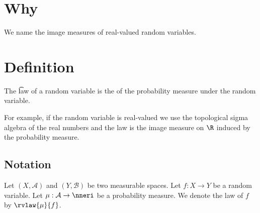 

\section*{Why}

We name the image measures of real-valued random variables.

\section*{Definition}

The \t{law} of a random variable is the of the probability measure under the random variable.

For example, if the random variable is real-valued we use the topological sigma algebra of the real numbers and the law is the image measure on $\R $ induced by the probability measure.

\subsection*{Notation}

Let $(X, \mathcal{A} )$ and $(Y, \mathcal{B} )$ be two measurable spaces.
Let $f: X \to Y$ be a random variable. Let $\mu : \mathcal{A} \to \nneri$ be a probability measure.
We denote the law of $f$ by $\rvlaw{\mu }{f}$.

\blankpage